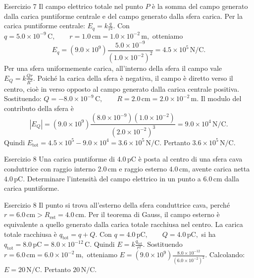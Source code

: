 \documentclass[a4paper]{article}
\begin{document}
\begin{snippetsolution}{Esercizio 7}
    Il campo elettrico totale nel punto \(P\) è la somma del campo generato
    dalla carica puntiforme centrale e del campo generato dalla sfera carica.
    Per la carica puntiforme centrale:
    \(E_q = k\frac{q}{r^2}.\)
    Con
    \(q = 5.0 \times 10^{-9}\,\mathrm{C}, \qquad r = 1.0\,\mathrm{cm} = 1.0 \times 10^{-2}\,\mathrm{m},\)
    otteniamo
    \[
        E_q =
        \left(9.0 \times 10^9\right)
        \frac{5.0 \times 10^{-9}}
        {\left(1.0 \times 10^{-2}\right)^2}
        =
        4.5 \times 10^5\,\mathrm{N/C}.
    \]
    Per una sfera uniformemente carica, all'interno della sfera il campo vale
    \(E_Q = k\frac{Qr}{R^3}.\)
    Poiché la carica della sfera è negativa, il campo è diretto verso il centro,
    cioè in verso opposto al campo generato dalla carica centrale positiva.
    Sostituendo:
    \(Q = -8.0 \times 10^{-9}\,\mathrm{C}, \qquad R = 2.0\,\mathrm{cm} = 2.0 \times 10^{-2}\,\mathrm{m}.\)
    Il modulo del contributo della sfera è
    \[
        |E_Q|
        =
        \left(9.0 \times 10^9\right)
        \frac{
            \left(8.0 \times 10^{-9}\right)
            \left(1.0 \times 10^{-2}\right)
        }{
            \left(2.0 \times 10^{-2}\right)^3
        }
        =
        9.0 \times 10^4\,\mathrm{N/C}.
    \]
    Quindi
    \(E_{\mathrm{tot}} = 4.5 \times 10^5 - 9.0 \times 10^4 = 3.6 \times 10^5\,\mathrm{N/C}.\)
    Pertanto
    \(\boxed{3.6 \times 10^5\,\mathrm{N/C}}.\)
\end{snippetsolution}
\begin{snippetexercise}{Esercizio 8}
    Una carica puntiforme di \(4.0\,\mathrm{pC}\) è posta al centro di una
    sfera cava conduttrice con raggio interno \(2.0\,\mathrm{cm}\) e raggio
    esterno \(4.0\,\mathrm{cm}\), avente carica netta \(4.0\,\mathrm{pC}\).
    Determinare l'intensità del campo elettrico in un punto a
    \(6.0\,\mathrm{cm}\) dalla carica puntiforme.

\end{snippetexercise}
\begin{snippetsolution}{Esercizio 8}
    Il punto si trova all'esterno della sfera conduttrice cava, perché
    \(r = 6.0\,\mathrm{cm} > R_{\mathrm{est}} = 4.0\,\mathrm{cm}.\)
    Per il teorema di Gauss, il campo esterno è equivalente a quello generato
    dalla carica totale racchiusa nel centro.
    La carica totale racchiusa è
    \(q_{\mathrm{tot}} = q + Q.\)
    Con
    \(q = 4.0\,\mathrm{pC}, \qquad Q = 4.0\,\mathrm{pC},\)
    si ha
    \(q_{\mathrm{tot}} = 8.0\,\mathrm{pC} = 8.0 \times 10^{-12}\,\mathrm{C}.\)
    Quindi
    \(E = k\frac{q_{\mathrm{tot}}}{r^2}.\)
    Sostituendo
    \(r = 6.0\,\mathrm{cm} = 6.0 \times 10^{-2}\,\mathrm{m},\)
    otteniamo
    \(E = \left(9.0 \times 10^9\right) \frac{8.0 \times 10^{-12}} {\left(6.0 \times 10^{-2}\right)^2}.\)
    Calcolando:
    \(E = 20\,\mathrm{N/C}.\)
    Pertanto
    \(\boxed{20\,\mathrm{N/C}}.\)
\end{snippetsolution}
\end{document}
